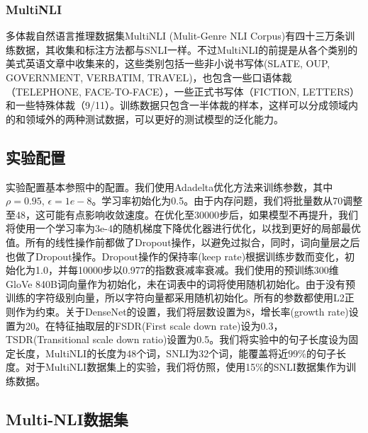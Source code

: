\documentclass[UTF8,11pt,a4paper,nofonts]{ctexart}
\begin{document}
\subsubsection{MultiNLI} 多体裁自然语言推理数据集MultiNLI (Mulit-Genre NLI Corpus)\cite{Nangia2017TheR2}有四十三万条训练数据，其收集和标注方法都与SNLI一样。不过MultiNLI的前提是从各个类别的美式英语文章中收集来的，这些类别包括一些非小说书写体(SLATE, OUP, GOVERNMENT, VERBATIM, TRAVEL)，也包含一些口语体裁（TELEPHONE, FACE-TO-FACE），一些正式书写体（FICTION, LETTERS）和一些特殊体裁（9/11）。训练数据只包含一半体裁的样本，这样可以分成领域内的和领域外的两种测试数据，可以更好的测试模型的泛化能力。

\subsection{实验配置}
实验配置基本参照\cite{yichen2018nli}中的配置。我们使用Adadelta优化方法来训练参数，其中$\rho=0.95$, $\epsilon=1e-8$。学习率初始化为0.5。由于内存问题，我们将批量数从70调整至48，这可能有点影响收敛速度。在优化至30000步后，如果模型不再提升，我们将使用一个学习率为3e-4的随机梯度下降优化器进行优化，以找到更好的局部最优值。所有的线性操作前都做了Dropout操作，以避免过拟合，同时，词向量层之后也做了Dropout操作。Dropout操作的保持率(keep rate)根据训练步数而变化，初始化为1.0，并每10000步以0.977的指数衰减率衰减。我们使用\cite{Pennington2014GloveGV}的预训练300维 GloVe 840B词向量作为初始化，未在词表中的词将使用随机初始化。由于没有预训练的字符级别向量，所以字符向量都采用随机初始化。所有的参数都使用L2正则作为约束。关于DenseNet的设置，我们将层数设置为8，增长率(growth rate)设置为20。在特征抽取层的FSDR(First scale down rate)设为0.3，TSDR(Transitional scale down ratio)设置为0.5。我们将实验中的句子长度设为固定长度，MultiNLI的长度为48个词，SNLI为32个词，能覆盖将近99\%的句子长度。对于MultiNLI数据集上的实验，我们将仿照\cite{Nangia2017TheR2}，使用15\%的SNLI数据集作为训练数据。


\subsection{Multi-NLI数据集}
\end{document}
